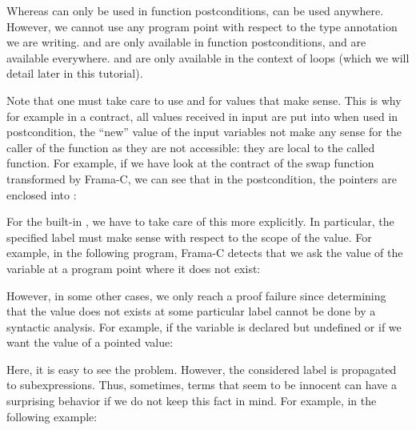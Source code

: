 Whereas  can only be used in function
postconditions,  can be used anywhere.
However, we cannot use any program point with respect to the type
annotation we are writing.  and  are only
available in function postconditions,  and 
are available everywhere.  and 
are only available in the context of loops (which we will detail later
in this tutorial).



Note that one must take care to use  and
 for values that make sense. This is why
for example in a contract, all values received in input are put into
 when used in postcondition, the ``new''
value of the input variables not make any sense for the caller of the
function as they are not accessible: they are local to the called function.
For example, if we have look at the contract of the swap function transformed
by Frama-C, we can see that in the postcondition, the pointers are enclosed into
:




For the built-in , we have to take care of this
more explicitly. In particular,
the specified label must make sense with respect to the scope of the
value. For example, in the following program, Frama-C detects that we ask
the value of the variable  at a program point where it does
not exist:






However, in some other cases, we only reach a proof failure since determining
that the value does not exists at some particular label cannot be done by
a syntactic analysis. For example, if the variable is declared but undefined
or if we want the value of a pointed value:




Here, it is easy to see the problem. However, the considered label is
propagated to subexpressions. Thus, sometimes, terms that seem to be
innocent can have a surprising behavior if we do not keep this fact in mind.
For example, in the following example:




